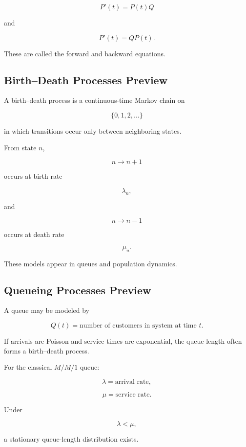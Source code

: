 \[
\boxed{
P'(t)
=
P(t)Q
}
\]

and

\[
\boxed{
P'(t)
=
QP(t).
}
\]

These are called the forward and backward equations.

\subsection{Birth--Death Processes Preview}
\label{subsec:birth-death-process-preview}

A birth--death process is a continuous-time Markov chain on

\[
\{0,1,2,\ldots\}
\]

in which transitions occur only between neighboring states.

From state \(n\),

\[
n\to n+1
\]

occurs at birth rate

\[
\lambda_n,
\]

and

\[
n\to n-1
\]

occurs at death rate

\[
\mu_n.
\]

These models appear in queues and population dynamics.

\subsection{Queueing Processes Preview}
\label{subsec:queueing-process-preview}

A queue may be modeled by

\[
Q(t)
=
\text{number of customers in system at time }t.
\]

If arrivals are Poisson and service times are exponential, the queue
length often forms a birth--death process.

For the classical \(M/M/1\) queue:

\[
\lambda
=
\text{arrival rate},
\]

\[
\mu
=
\text{service rate}.
\]

Under

\[
\lambda<\mu,
\]

a stationary queue-length distribution exists.

